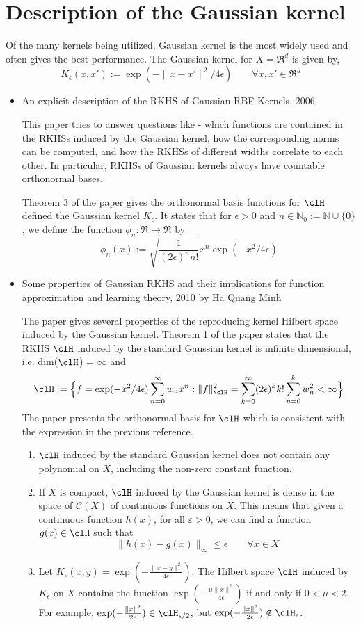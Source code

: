 \section{Description of the Gaussian kernel}
\label{gaussian_kernel}

Of the many kernels being utilized, Gaussian kernel is the most widely used and often gives the best performance. The Gaussian kernel for $X = \Re^d$ is given by,
\[
K_{\epsilon}(x,x') := \exp(-\|x - x'\|^2/ 4\epsilon) \qquad \forall x,x' \in \Re^d
\]
\begin{itemize}
\item An explicit description of the RKHS of Gaussian RBF Kernels, 2006 

This paper tries to answer questions like - which functions are contained in the RKHSs induced by the Gaussian kernel, how the corresponding norms can be computed, and how the RKHSs of different widths correlate to each other. 
In particular, RKHSs of Gaussian kernels always have countable orthonormal bases. 

Theorem 3 of the paper gives the orthonormal basis functions for $\clH$ defined the Gaussian kernel $K_\epsilon$. It states that for $\epsilon >0$ and $n \in \mathbb{N}_0 := \mathbb{N} \cup \{0\}$, we define the function $\phi_n : \Re \to \Re$ by
\[
\phi_n(x) := \sqrt{\frac{1}{(2\epsilon)^n n!}}x^n \exp(-x^2/4\epsilon)
\]
\item Some properties of Gaussian RKHS and their implications for function approximation and learning theory, 2010 by Ha Quang Minh

The paper gives several properties of the reproducing kernel Hilbert space induced by the Gaussian kernel.
Theorem 1 of the paper states that the RKHS $\clH$ induced by the standard Gaussian kernel is infinite dimensional, i.e. dim($\clH$) = $\infty$ and 
\[
\clH := \Bigl\{ f = \exp(-x^2/4\epsilon) \sum_{n=0}^\infty w_n x^n: \|f\|^2_\clH = \sum_{k=0}^\infty (2\epsilon)^k k! \sum_{n=0}^k w_n^2 <\infty \Bigr\}
\]
The paper presents the orthonormal basis for $\clH$ which is consistent with the expression in the previous reference. 

\begin{enumerate}
	\item $\clH$ induced by the standard Gaussian kernel does not contain any polynomial on $X$, including the non-zero constant function. 
	
	\item If $X$ is compact, $\clH$ induced by the Gaussian kernel is dense in the space of $\mathcal{C}(X)$ of continuous functions on $X$.
	This means that given a continuous function $h(x)$, for all $\varepsilon >0$, we can find a function $g(x) \in \clH$ such that 
	\[
	\|h(x) - g(x)\|_\infty \leq \epsilon \qquad \forall x \in X
	\] 
	\item Let $K_{\epsilon}(x,y) = \exp(-\frac{\|x-y\|^2}{4\epsilon})$. The Hilbert space $\clH$ induced by $K_\epsilon$ on $X$ contains the function $\exp(-\frac{\mu \|x\|^2} {4 \epsilon})$ if and only if $0<\mu <2$. For example, $\exp(-\frac{\|x\|^2}{2 \epsilon}) \in \clH_{\epsilon/2}$, but  $\exp(-\frac{\|x\|^2}{2 \epsilon}) \notin \clH_{\epsilon}$.
	

\end{enumerate}
\end{itemize}
